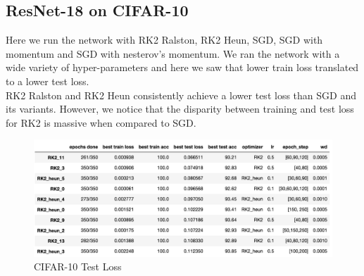 \subsection*{ResNet-18 on CIFAR-10}
Here we run the network with RK2 Ralston, RK2 Heun, SGD,
SGD with momentum and SGD with nesterov's momentum. We
ran the network with a wide variety of hyper-parameters
and here we saw that lower train loss translated to a
lower test loss.
\\
RK2 Ralston and RK2 Heun consistently achieve a lower
test loss than SGD and its variants. However, we notice
that the disparity between training and test loss for
RK2 is massive when compared to SGD.

\begin{figure}[htb]
\includegraphics[scale=0.5]{cifar_resnet18_test_loss.png}
\caption{CIFAR-10 Test Loss}
\end{figure}




